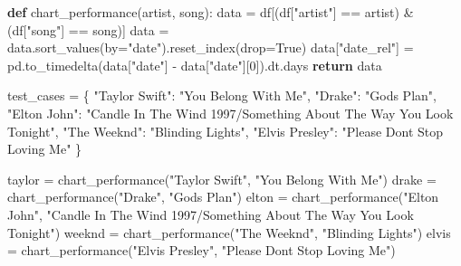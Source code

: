 \documentclass[
  a4paper,
]{scrbook}
\newenvironment{Shaded}{\begin{snugshade}}{\end{snugshade}}
\newcommand{\ControlFlowTok}[1]{\textcolor[rgb]{0.00,0.23,0.31}{\textbf{#1}}}
\newcommand{\DecValTok}[1]{\textcolor[rgb]{0.68,0.00,0.00}{#1}}
\newcommand{\KeywordTok}[1]{\textcolor[rgb]{0.00,0.23,0.31}{\textbf{#1}}}
\newcommand{\NormalTok}[1]{\textcolor[rgb]{0.00,0.23,0.31}{#1}}
\newcommand{\OperatorTok}[1]{\textcolor[rgb]{0.37,0.37,0.37}{#1}}
\newcommand{\StringTok}[1]{\textcolor[rgb]{0.13,0.47,0.30}{#1}}
\newcommand{\VariableTok}[1]{\textcolor[rgb]{0.07,0.07,0.07}{#1}}
\begin{document}
\begin{Shaded}
\begin{Highlighting}[]
\KeywordTok{def}\NormalTok{ chart\_performance(artist, song):}
\NormalTok{    data }\OperatorTok{=}\NormalTok{ df[(df[}\StringTok{"artist"}\NormalTok{] }\OperatorTok{==}\NormalTok{ artist) }\OperatorTok{\&}\NormalTok{ (df[}\StringTok{"song"}\NormalTok{] }\OperatorTok{==}\NormalTok{ song)]}
\NormalTok{    data }\OperatorTok{=}\NormalTok{ data.sort\_values(by}\OperatorTok{=}\StringTok{"date"}\NormalTok{).reset\_index(drop}\OperatorTok{=}\VariableTok{True}\NormalTok{)}
\NormalTok{    data[}\StringTok{"date\_rel"}\NormalTok{] }\OperatorTok{=}\NormalTok{ pd.to\_timedelta(data[}\StringTok{"date"}\NormalTok{] }\OperatorTok{{-}}\NormalTok{ data[}\StringTok{"date"}\NormalTok{][}\DecValTok{0}\NormalTok{]).dt.days}
    \ControlFlowTok{return}\NormalTok{ data}
\end{Highlighting}
\end{Shaded}

\begin{Shaded}
\begin{Highlighting}[]
\NormalTok{test\_cases }\OperatorTok{=}\NormalTok{ \{}
    \StringTok{"Taylor Swift"}\NormalTok{: }\StringTok{"You Belong With Me"}\NormalTok{,}
    \StringTok{"Drake"}\NormalTok{: }\StringTok{"God\textquotesingle{}s Plan"}\NormalTok{,}
    \StringTok{"Elton John"}\NormalTok{: }\StringTok{"Candle In The Wind 1997/Something About The Way You Look Tonight"}\NormalTok{,}
    \StringTok{"The Weeknd"}\NormalTok{: }\StringTok{"Blinding Lights"}\NormalTok{,}
    \StringTok{"Elvis Presley"}\NormalTok{: }\StringTok{"Please Don\textquotesingle{}t Stop Loving Me"}
\NormalTok{\}}
\end{Highlighting}
\end{Shaded}

\begin{Shaded}
\begin{Highlighting}[]
\NormalTok{taylor }\OperatorTok{=}\NormalTok{ chart\_performance(}\StringTok{"Taylor Swift"}\NormalTok{, }\StringTok{"You Belong With Me"}\NormalTok{)}
\NormalTok{drake }\OperatorTok{=}\NormalTok{ chart\_performance(}\StringTok{"Drake"}\NormalTok{, }\StringTok{"God\textquotesingle{}s Plan"}\NormalTok{)}
\NormalTok{elton }\OperatorTok{=}\NormalTok{ chart\_performance(}\StringTok{"Elton John"}\NormalTok{, }\StringTok{"Candle In The Wind 1997/Something About The Way You Look Tonight"}\NormalTok{)}
\NormalTok{weeknd }\OperatorTok{=}\NormalTok{ chart\_performance(}\StringTok{"The Weeknd"}\NormalTok{, }\StringTok{"Blinding Lights"}\NormalTok{)}
\NormalTok{elvis }\OperatorTok{=}\NormalTok{ chart\_performance(}\StringTok{"Elvis Presley"}\NormalTok{, }\StringTok{"Please Don\textquotesingle{}t Stop Loving Me"}\NormalTok{)}
\end{Highlighting}
\end{Shaded}
\end{document}
